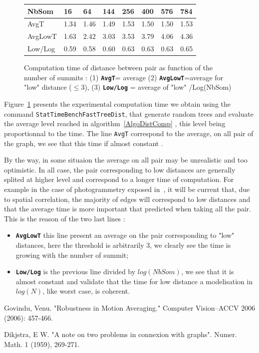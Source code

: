 \documentclass[a4paper]{article}
\begin{document}
\begin{figure}
\centering
\begin{tabular}{| l || l |l | l | l | l | l | l |}
   \hline
   NbSom        & 16     & 64     & 144    &    256 &   400 &   576     & 784   \\ \hline \hline
   AvgT         & 1.34   & 1.46   & 1.49   &   1.53 &  1.50 &   1.50   & 1.53   \\ \hline
   AvgLowT      & 1.63   & 2.42   & 3.03   &   3.53 &  3.79 &   4.06   & 4.36   \\ \hline
   Low/Log  & 0.59   & 0.58   &  0.60  &    0.63 & 0.63 &   0.63   &  0.65      \\ \hline 
\end{tabular}
\caption{Computation time of distance between pair as function of the number of summits : (1) {\tt \bf AvgT}= average 
(2) {\tt \bf  AvgLowT}=average for "low" distance ($\leq 3$), (3) {\tt \bf Low/Log} =  average of "low" /Log(NbSom)}
\label{ExpCalc}
\end{figure}


Figure~\ref{ExpCalc} presents the experimental computation time we obtain using the 
command {\tt StatTimeBenchFastTreeDist}, that generate random trees and evaluate
the average level reached in algorithm~\ref{AlgoDistComp} , this level being proportionnal to the time.
The line {\tt AvgT}  correspond to the average, on all pair of the graph, 
we see that this time if almost constant .

By the way, in some situaion the average on all pair may be unrealistic and too optimistic.
In all case, the pair corresponding to low distances are generally splited at higher level
and correspond to a longer time of computation.
For example in the case  of photogrammetry exposed in~\cite{Govin2006}, it will be current
that, due to spatial correlation, the majority of edges will correspond to low distances and
that the average time is more important that predicted when taking all the pair.
This is the reason of the two last lines :

\begin{itemize}
    \item {\tt \bf  AvgLowT}  this line present an average on the pair corresponding to "low" distances,
         here the threshold is arbitrarily $3$, we clearly see the time is growing with the number of summit;

    \item {\tt \bf  Low/Log}  is the previous line divided by $log(NbSom)$, we see that it is almost constant
          and validate that the time for low distance a modelisation in $log(N)$, like worst case, is coherent.
\end{itemize}


\begin{thebibliography}{References}
          Govindu, Venu. "Robustness in Motion Averaging." Computer Vision–ACCV 2006 (2006): 457-466.

      Dikjstra, E W. "A note on two problems in connexion with graphs". 
           Numer. Math. 1 (1959), 269-271.
\end{thebibliography}
\end{document}

